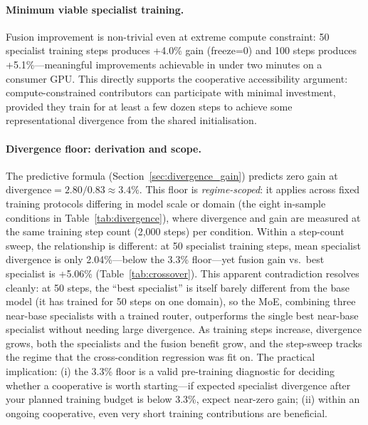 \documentclass{article}
\begin{document}
\paragraph{Minimum viable specialist training.} Fusion improvement is non-trivial even at extreme compute constraint: 50 specialist training steps produces +4.0\% gain (freeze=0) and 100 steps produces +5.1\%---meaningful improvements achievable in under two minutes on a consumer GPU. This directly supports the cooperative accessibility argument: compute-constrained contributors can participate with minimal investment, provided they train for at least a few dozen steps to achieve some representational divergence from the shared initialisation.

\paragraph{Divergence floor: derivation and scope.}
The predictive formula (Section~\ref{sec:divergence_gain}) predicts zero gain at $\text{divergence} = 2.80 / 0.83 \approx 3.4\%$. This floor is \emph{regime-scoped}: it applies across fixed training protocols differing in model scale or domain (the eight in-sample conditions in Table~\ref{tab:divergence}), where divergence and gain are measured at the same training step count (2,000 steps) per condition. Within a step-count sweep, the relationship is different: at 50 specialist training steps, mean specialist divergence is only 2.04\%---below the 3.3\% floor---yet fusion gain vs.\ best specialist is +5.06\% (Table~\ref{tab:crossover}). This apparent contradiction resolves cleanly: at 50 steps, the ``best specialist'' is itself barely different from the base model (it has trained for 50 steps on one domain), so the MoE, combining three near-base specialists with a trained router, outperforms the single best near-base specialist without needing large divergence. As training steps increase, divergence grows, both the specialists and the fusion benefit grow, and the step-sweep tracks the regime that the cross-condition regression was fit on. The practical implication: (i) the 3.3\% floor is a valid pre-training diagnostic for deciding whether a cooperative is worth starting---if expected specialist divergence after your planned training budget is below 3.3\%, expect near-zero gain; (ii) within an ongoing cooperative, even very short training contributions are beneficial.
\end{document}
